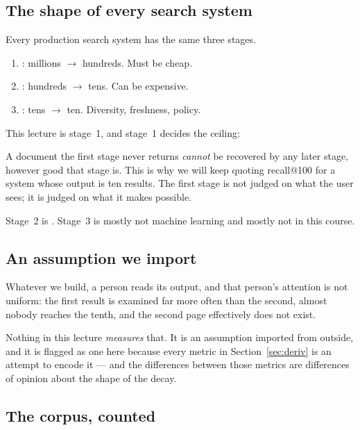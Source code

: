 \documentclass[11pt,a4paper]{article}
\begin{document}
\subsection{The shape of every search system}

Every production search system has the same three stages.

\begin{enumerate}[leftmargin=*]
  \item {}: millions $\rightarrow$ hundreds. Must be cheap.
  \item {}: hundreds $\rightarrow$ tens. Can be expensive.
  \item {}: tens $\rightarrow$ ten. Diversity, freshness, policy.
\end{enumerate}

This lecture is stage~1, and stage~1 decides the ceiling:

\begin{keybox}[title={The first-stage ceiling}]
A document the first stage never returns \emph{cannot} be recovered by any
later stage, however good that stage is. This is why we will keep quoting
recall@100 for a system whose output is ten results. The first stage is not
judged on what the user sees; it is judged on what it makes possible.
\end{keybox}

Stage~2 is . Stage~3 is mostly not machine learning and mostly not
in this course.

\subsection{An assumption we import}

Whatever we build, a person reads its output, and that person's attention is
not uniform: the first result is examined far more often than the second,
almost nobody reaches the tenth, and the second page effectively does not
exist.

Nothing in this lecture \emph{measures} that. It is an assumption imported from
outside, and it is flagged as one here because every metric in
Section~\ref{sec:deriv} is an attempt to encode it --- and the differences
between those metrics are differences of opinion about the shape of the decay.

\subsection{The corpus, counted}
\end{document}
